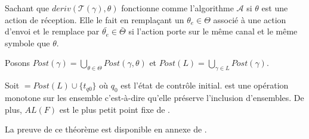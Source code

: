 Sachant que $deriv(\mathcal{T}(\gamma),\theta)$ fonctionne comme l'algorithme $\mathcal{A}$ si $\theta$ est une action de réception. Elle le fait en remplaçant un $\theta_e \in \Theta$ associé à une action d'envoi et le remplace par $\bar{\theta_e} \in \bar{\Theta}$ si l'action porte sur le même canal et le même symbole que $\theta$.

Posons $Post(\gamma)=\bigcup_{\theta\in\Theta}Post(\gamma,\theta)$ et $Post(L)=\bigcup_{\gamma\in L}Post(\gamma)$.


\begin{theorem}\label{thm:fl}
  Soit \fl$=Post(L)\cup\{t_{q0}\}$ où $q_0$ est l'état de contrôle initial. \fl est une opération monotone sur les ensemble c'est-à-dire qu'elle préserve l'inclusion d'ensembles. De plus, $AL(F)$ est le plus petit point fixe de \fl.
\end{theorem}
La preuve de ce théorème est disponible en annexe de \cite{Vardhan04}.
